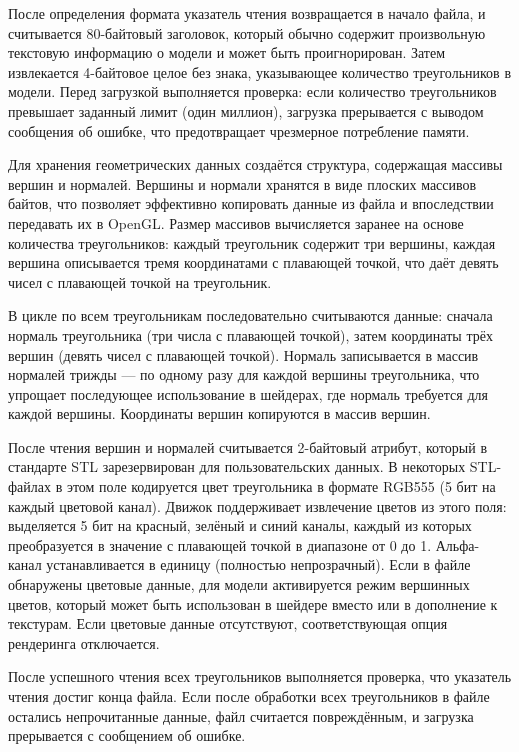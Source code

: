 После определения формата указатель чтения возвращается в начало файла, и считывается 80-байтовый заголовок, который обычно содержит произвольную текстовую информацию о модели и может быть проигнорирован. Затем извлекается 4-байтовое целое без знака, указывающее количество треугольников в модели. Перед загрузкой выполняется проверка: если количество треугольников превышает заданный лимит (один миллион), загрузка прерывается с выводом сообщения об ошибке, что предотвращает чрезмерное потребление памяти.

Для хранения геометрических данных создаётся структура, содержащая массивы вершин и нормалей. Вершины и нормали хранятся в виде плоских массивов байтов, что позволяет эффективно копировать данные из файла и впоследствии передавать их в OpenGL. Размер массивов вычисляется заранее на основе количества треугольников: каждый треугольник содержит три вершины, каждая вершина описывается тремя координатами с плавающей точкой, что даёт девять чисел с плавающей точкой на треугольник.

В цикле по всем треугольникам последовательно считываются данные: сначала нормаль треугольника (три числа с плавающей точкой), затем координаты трёх вершин (девять чисел с плавающей точкой). Нормаль записывается в массив нормалей трижды — по одному разу для каждой вершины треугольника, что упрощает последующее использование в шейдерах, где нормаль требуется для каждой вершины. Координаты вершин копируются в массив вершин.

После чтения вершин и нормалей считывается 2-байтовый атрибут, который в стандарте STL зарезервирован для пользовательских данных. В некоторых STL-файлах в этом поле кодируется цвет треугольника в формате RGB555 (5 бит на каждый цветовой канал). Движок поддерживает извлечение цветов из этого поля: выделяется 5 бит на красный, зелёный и синий каналы, каждый из которых преобразуется в значение с плавающей точкой в диапазоне от 0 до 1. Альфа-канал устанавливается в единицу (полностью непрозрачный). Если в файле обнаружены цветовые данные, для модели активируется режим вершинных цветов, который может быть использован в шейдере вместо или в дополнение к текстурам. Если цветовые данные отсутствуют, соответствующая опция рендеринга отключается.

После успешного чтения всех треугольников выполняется проверка, что указатель чтения достиг конца файла. Если после обработки всех треугольников в файле остались непрочитанные данные, файл считается повреждённым, и загрузка прерывается с сообщением об ошибке.

